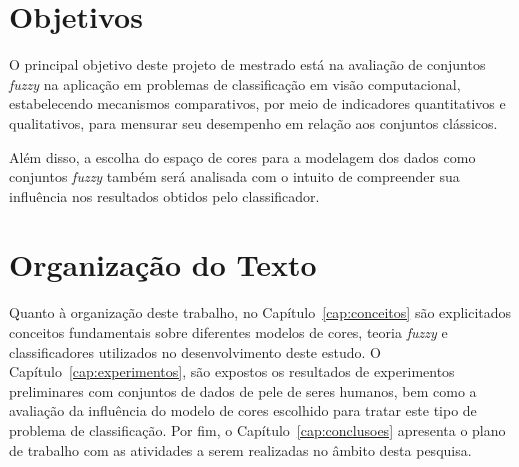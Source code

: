 \section{Objetivos}
\label{sec:objetivo}

O principal objetivo deste projeto de mestrado está na avaliação de conjuntos \emph{fuzzy} na aplicação em problemas de classificação em visão computacional, estabelecendo mecanismos comparativos, por meio de indicadores quantitativos e qualitativos, para mensurar seu desempenho em relação aos conjuntos clássicos.

Além disso, a escolha do espaço de cores para a modelagem dos dados como conjuntos \emph{fuzzy} também será analisada com o intuito de compreender sua influência nos resultados obtidos pelo classificador.


\section{Organização do Texto}
\label{sec:organizacao_trabalho}

Quanto à organização deste trabalho, no Capítulo~\ref{cap:conceitos} são explicitados conceitos fundamentais sobre diferentes modelos de cores, teoria \emph{fuzzy} e classificadores utilizados no desenvolvimento deste estudo. O Capítulo~\ref{cap:experimentos}, são expostos os resultados de experimentos preliminares com conjuntos de dados de pele de seres humanos, bem como a avaliação da influência do modelo de cores escolhido para tratar este tipo de problema de classificação. Por fim, o Capítulo~\ref{cap:conclusoes} apresenta o plano de trabalho com as atividades a serem realizadas no âmbito desta pesquisa.
